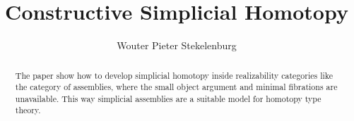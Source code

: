 \documentclass{tac}
\title{Constructive Simplicial Homotopy}
\author{Wouter Pieter Stekelenburg}\copyrightyear{2015}
\newcommand\hide[1]{}
\begin{document}
\begin{abstract} The paper show how to develop simplicial homotopy inside realizability categories like the category of assemblies, where the small object argument and minimal fibrations are unavailable. This way simplicial assemblies are a suitable model for homotopy type theory.\end{abstract}

\hide{
Three papers:
-simplicial homotopy
-complete categories [how they are preserved]
-the realizability model of HOTT [how to get  fibrant object out of a category]

Idee: reverse the order. definitions--theorem--lemmas. That way the purpose of the lemmas is set up from the start.
}

\hide{
2 dimensional case: 
* cofibration has decidable inclusion+decidability of degeneracy in the complement
* fibration has lifting operator
* weak equivalence is (probably) homotopy equivalence.
}

\maketitle

\hide{
Thorough investigation of the background. If we have an ELCCC then the poset-reflection is a Heyting algebra. The reindexing morphisms between the poset reflections are Heyting algebra morphisms and its adjoints remain adjoints.

}
\end{document}

